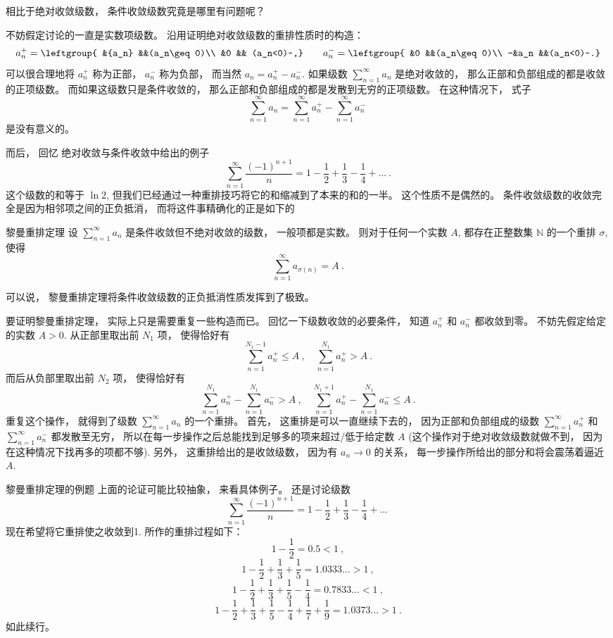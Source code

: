 

相比于绝对收敛级数， 条件收敛级数究竟是哪里有问题呢？ 

不妨假定讨论的一直是实数项级数。 沿用证明绝对收敛级数的重排性质时的构造： 
$$
a_n^+=\leftgroup{
&{a_n} &&(a_n\geq0)\\
&0 && (a_n<0)~,}
\qquad
a_n^-=\leftgroup{
&0 &&(a_n\geq0)\\
-&a_n &&(a_n<0)~.}
$$
可以很合理地将 $a_n^+$ 称为正部， $a_n^-$ 称为负部， 而当然 $a_n=a_n^+-a_n^-$. 如果级数 $\sum_{n=1}^\infty a_n$ 是绝对收敛的， 那么正部和负部组成的都是收敛的正项级数。 而如果这级数只是条件收敛的， 那么正部和负部组成的都是发散到无穷的正项级数。 在这种情况下， 式子
$$
\sum_{n=1}^\infty a_n=\sum_{n=1}^\infty a_n^+-\sum_{n=1}^\infty a_n^-~
$$
是没有意义的。

而后， 回忆 绝对收敛与条件收敛中给出的例子
$$
\sum_{n=1}^\infty\frac{(-1)^{n+1}}{n}
=1-\frac{1}{2}+\frac{1}{3}-\frac{1}{4}+...~.
$$
这个级数的和等于 $\ln2$, 但我们已经通过一种重排技巧将它的和缩减到了本来的和的一半。 这个性质不是偶然的。 条件收敛级数的收敛完全是因为相邻项之间的正负抵消， 而将这件事精确化的正是如下的

\begin{theorem}{黎曼重排定理}
设 $\sum_{n=1}^\infty a_n$ 是条件收敛但不绝对收敛的级数， 一般项都是实数。 则对于任何一个实数 $A$, 都存在正整数集 $\mathbb{N}$ 的一个重排 $\sigma$, 使得
$$
\sum_{n=1}^\infty a_{\sigma(n)}=A~.
$$
\end{theorem}

可以说， 黎曼重排定理将条件收敛级数的正负抵消性质发挥到了极致。

要证明黎曼重排定理， 实际上只是需要重复一些构造而已。 回忆一下级数收敛的必要条件， 知道 $a_n^+$ 和 $a_n^-$ 都收敛到零。 不妨先假定给定的实数 $A>0$. 从正部里取出前 $N_1$ 项， 使得恰好有
\[
\sum_{n=1}^{N_1-1}a_n^+\leq A~,
\quad
\sum_{n=1}^{N_1}a_n^+> A~.
\]
而后从负部里取出前 $N_2$ 项， 使得恰好有
\[
\sum_{n=1}^{N_1}a_n^+-\sum_{n=1}^{N_1}a_n^-> A~,
\quad
\sum_{n=1}^{N_1+1}a_n^+-\sum_{n=1}^{N_1}a_n^-\leq A~.
\]
重复这个操作， 就得到了级数 $\sum_{n=1}^\infty a_n$ 的一个重排。 首先， 这重排是可以一直继续下去的， 因为正部和负部组成的级数 $\sum_{n=1}^\infty a_n^+$ 和 $\sum_{n=1}^\infty a_n^-$ 都发散至无穷， 所以在每一步操作之后总能找到足够多的项来超过/低于给定数 $A$ (这个操作对于绝对收敛级数就做不到， 因为在这种情况下找再多的项都不够). 另外， 这重排给出的是收敛级数， 因为有 $a_n\to0$ 的关系， 每一步操作所给出的部分和将会震荡着逼近 $A$.

\begin{example}{黎曼重排定理的例题}
上面的论证可能比较抽象， 来看具体例子。 还是讨论级数
$$
\sum_{n=1}^\infty\frac{(-1)^{n+1}}{n}
=1-\frac{1}{2}+\frac{1}{3}-\frac{1}{4}+...~
$$
现在希望将它重排使之收敛到1. 所作的重排过程如下：
$$
1-\frac{1}{2}=0.5<1~,
$$ 
$$
1-\frac{1}{2}+\frac{1}{3}+\frac{1}{5}=1.0333...>1~,
$$ 
$$
1-\frac{1}{2}+\frac{1}{3}+\frac{1}{5}-\frac{1}{4}=0.7833...<1~,
$$ 
$$
1-\frac{1}{2}+\frac{1}{3}+\frac{1}{5}-\frac{1}{4}+\frac{1}{7}+\frac{1}{9}=1.0373...>1~.
$$
如此续行。
\end{example}
